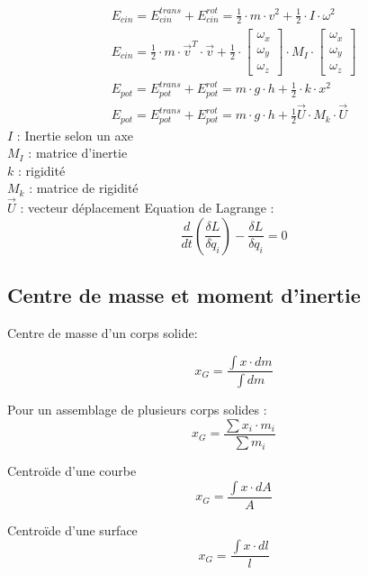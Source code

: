 \begin{eqnarray}
E_{cin}=E_{cin}^{trans}+E_{cin}^{rot}=\frac{1}{2}\cdot m \cdot v^2+\frac{1}{2} \cdot I \cdot \omega^2\\
E_{cin}=\frac{1}{2}\cdot m \cdot  \vec{v}^T \cdot \vec{v}+ \frac{1}{2}\cdot 
\begin{bmatrix}
\omega_x \\
\omega_y \\
\omega_z 
\end{bmatrix} \cdot M_I \cdot \begin{bmatrix}
\omega_x \\
\omega_y \\
\omega_z 
\end{bmatrix} \\
E_{pot}=E_{pot}^{trans}+E_{pot}^{rot}=m \cdot g \cdot h + \frac{1}{2} \cdot k \cdot x^2\\
E_{pot}=E_{pot}^{trans}+E_{pot}^{rot}=m \cdot g \cdot h + \frac{1}{2} \vec{U} \cdot M_k \cdot \vec{U} 
\end{eqnarray}
$I$ : Inertie selon un axe\\
$M_I$ : matrice d'inertie\\
$k$ : rigidité\\
$M_k$ : matrice de rigidité\\
$\vec{U}$ : vecteur déplacement
\medbreak
Equation de Lagrange :
\begin{equation}
\frac{d}{dt}(\frac{\delta L}{\delta \dot{q}_i})-\frac{\delta L}{\delta q_i}=0
\end{equation}


\subsection{Centre de masse et moment d'inertie}
Centre de masse d'un corps solide:

\begin{equation}
x_G=\frac{\int x \cdot dm}{\int dm}
\end{equation}

Pour un assemblage de plusieurs corps solides :
\begin{equation}
x_G=\frac{\sum x_i \cdot m_i}{\sum m_i}
\end{equation}

Centroïde d'une courbe
\begin{equation}
x_G=\frac{\int x \cdot dA}{A}
\end{equation}

Centroïde d'une surface 
\begin{equation}
x_G=\frac{\int x \cdot dl}{l}
\end{equation}

